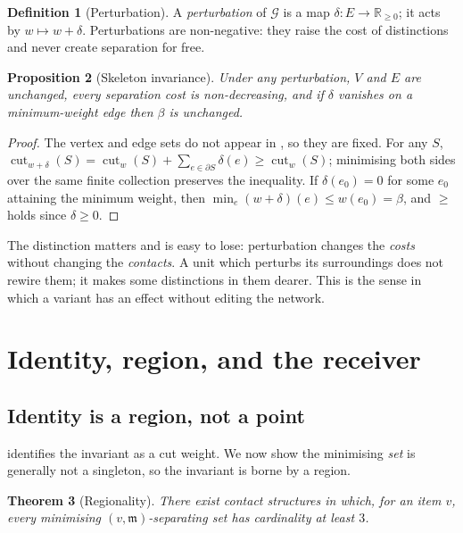 \documentclass[11pt,twocolumn,a4paper]{article}
\theoremstyle{plain}
\newtheorem{theorem}{Theorem}[section]
\newtheorem{proposition}[theorem]{Proposition}
\theoremstyle{definition}
\newtheorem{definition}[theorem]{Definition}
\theoremstyle{remark}
\newcommand{\flo}{\beta}                       %
\newcommand{\med}{\mathfrak{m}}                %
\newcommand{\Gph}{\mathcal{G}}
\newcommand{\Ver}{V}
\newcommand{\Edg}{E}
\newcommand{\weight}{w}
\newcommand{\Rnn}{\mathbb{R}_{\ge 0}}
\DeclareMathOperator{\cut}{cut}
\begin{document}
\begin{definition}[Perturbation]
\label{def:perturbation}
A \emph{perturbation} of $\Gph$ is a map $\delta:\Edg\to\Rnn$; it acts by
$\weight\mapsto\weight+\delta$. Perturbations are non-negative:
they raise the cost of distinctions and never create separation for
free.
\end{definition}

\begin{proposition}[Skeleton invariance]
\label{prop:skeleton}
Under any perturbation, $\Ver$ and $\Edg$ are unchanged, every
separation cost is non-decreasing, and if $\delta$ vanishes on a
minimum-weight edge then $\flo$ is unchanged.
\end{proposition}

\begin{proof}
The vertex and edge sets do not appear in , so
they are fixed. For any $S$, $\cut_{\weight+\delta}(S)=\cut_\weight(S)+
\sum_{e\in\partial S}\delta(e)\ge \cut_\weight(S)$; minimising both
sides over the same finite collection preserves the inequality. If
$\delta(e_0)=0$ for some $e_0$ attaining the minimum weight, then
$\min_e(\weight+\delta)(e)\le \weight(e_0)=\flo$, and $\ge$ holds since
$\delta\ge0$.
\end{proof}

The distinction matters and is easy to lose: perturbation changes the
\emph{costs} without changing the \emph{contacts}. A unit which
perturbs its surroundings does not rewire them; it makes some
distinctions in them dearer. This is the sense in which a variant has an
effect without editing the network.

\section{Identity, region, and the receiver}
\label{sec:identity}

\subsection{Identity is a region, not a point}

 identifies the invariant as a cut weight. We
now show the minimising \emph{set} is generally not a singleton, so the
invariant is borne by a region.

\begin{theorem}[Regionality]
\label{thm:region}
There exist contact structures in which, for an item $v$, every
minimising $(v,\med)$-separating set has cardinality at least $3$.
\end{theorem}
\end{document}
